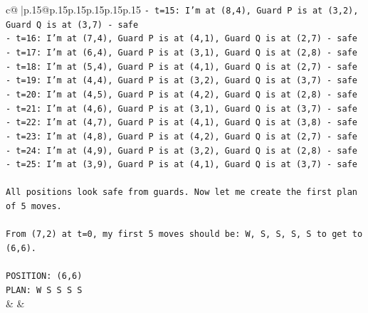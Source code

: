 \documentclass{article}
\begin{document}
{\begin{supertabular}{c@{$\;$}|p{.15\linewidth}@{}p{.15\linewidth}p{.15\linewidth}p{.15\linewidth}p{.15\linewidth}p{.15\linewidth}}
{{{\texttt{{-} t=15: I'm at (8,4), Guard P is at (3,2), Guard Q is at (3,7) {-} safe} \\
\texttt{{-} t=16: I'm at (7,4), Guard P is at (4,1), Guard Q is at (2,7) {-} safe} \\
\texttt{{-} t=17: I'm at (6,4), Guard P is at (3,1), Guard Q is at (2,8) {-} safe} \\
\texttt{{-} t=18: I'm at (5,4), Guard P is at (4,1), Guard Q is at (2,7) {-} safe} \\
\texttt{{-} t=19: I'm at (4,4), Guard P is at (3,2), Guard Q is at (3,7) {-} safe} \\
\texttt{{-} t=20: I'm at (4,5), Guard P is at (4,2), Guard Q is at (2,8) {-} safe} \\
\texttt{{-} t=21: I'm at (4,6), Guard P is at (3,1), Guard Q is at (3,7) {-} safe} \\
\texttt{{-} t=22: I'm at (4,7), Guard P is at (4,1), Guard Q is at (3,8) {-} safe} \\
\texttt{{-} t=23: I'm at (4,8), Guard P is at (4,2), Guard Q is at (2,7) {-} safe} \\
\texttt{{-} t=24: I'm at (4,9), Guard P is at (3,2), Guard Q is at (2,8) {-} safe} \\
\texttt{{-} t=25: I'm at (3,9), Guard P is at (4,1), Guard Q is at (3,7) {-} safe} \\
\\ 
\texttt{All positions look safe from guards. Now let me create the first plan of 5 moves.} \\
\\ 
\texttt{From (7,2) at t=0, my first 5 moves should be: W, S, S, S, S to get to (6,6).} \\
\\ 
\texttt{POSITION: (6,6)} \\
\texttt{PLAN: W S S S S} \\
            }
        }
    }
    & & \\ \\


\end{supertabular}}
\end{document}

